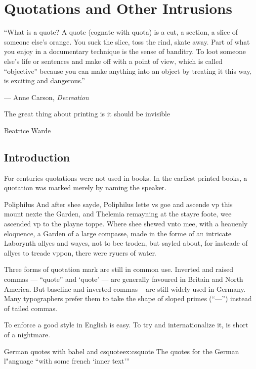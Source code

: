 \chapter{Quotations and Other Intrusions}
\normalfont

\epigraph{“What is a quote? A quote (cognate with quota) is a cut, a section, a slice of someone else’s orange. You suck the slice, toss the rind, skate away. Part of what you enjoy in a documentary technique is the sense of banditry. To loot someone else’s life or sentences and make off with a point of view, which is called “objective” because you can make anything into an object by treating it this way, is exciting and dangerous.”}{--- Anne Carson, \textit{Decreation}}

\epigraph{The great thing about printing is it should be invisible}{Beatrice Warde}
\section{Introduction}

For centuries quotations were not used in books. In the earliest printed books, a quotation was marked merely by naming the speaker.

\begin{scriptexample}[]{Poliphilus}
And after shee sayde, Poliphilus lette vs goe and ascende vp this mount nexte the Garden, and Thelemia remayning at the stayre foote, wee ascended vp to the playne toppe. Where shee shewed vnto mee, with a heauenly eloquence, a Garden of a large compasse, made in the forme of an intricate Laborynth allyes and wayes, not to bee troden, but sayled about, for insteade of allyes to treade vppon, there were ryuers of water.
\end{scriptexample}

Three forms of quotation mark are still in common use. Inverted and raised commas --- ``quote'' and
`quote' --- are generally favoured in Britain and North America. But baseline and inverted commas --
are still widely used in Germany. Many typographers prefer them to take the shape of
sloped primes (\enquote{---}) instead of tailed commas. 

To enforce a good style in English is easy. To try and internationalize it, is short of a nightmare.

\begin{texexample}{German quotes with babel and csquote}{ex:csquote}
The quotes for the German l"anguage \foreignquote{ngerman}{with some french \foreignquote*{french}{inner text}}
\end{texexample}


